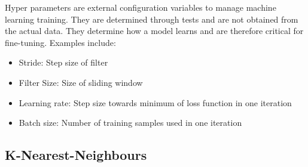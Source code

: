\documentclass{article}
\begin{document}
 Hyper parameters are external configuration variables to manage machine learning training. They are determined through tests and are not obtained from the actual data. They determine how a model learns and are therefore critical for fine-tuning. Examples include:
 \begin{itemize}
     \item Stride: Step size of filter
     \item Filter Size: Size of sliding window
     \item Learning rate: Step size towards minimum of loss function in one iteration
     \item Batch size: Number of training samples used in one iteration
 \end{itemize}
        
\newpage
\subsection{K-Nearest-Neighbours}
\end{document}
